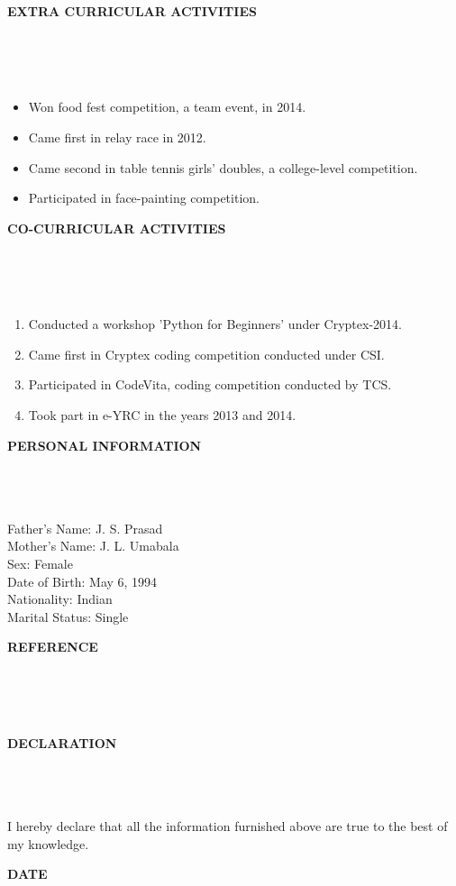 \documentclass[a4paper,10pt]{article}
\newcommand{\lsep}{-0.5cm}
\newcommand{\resheading}[1]{{\small \colorbox{mygrey}{\begin{minipage}{0.975\textwidth}{\textbf{#1 \vphantom{p\^{E}}}}\end{minipage}}}}
\begin{document}
\resheading{\textbf{EXTRA CURRICULAR ACTIVITIES} }\\[\lsep]
\\ \\
\begin{itemize}
	\item Won food fest competition, a team event, in 2014.
	\item Came first in relay race in 2012.
	\item Came second in table tennis girls' doubles, a college-level competition.
	\item Participated in face-painting competition.
\end{itemize}


\resheading{\textbf{CO-CURRICULAR ACTIVITIES} }\\[\lsep]
\\ \\
\begin{enumerate}
	\item \noindent Conducted a workshop 'Python for Beginners' under Cryptex-2014.
	\item \noindent Came first in Cryptex coding competition conducted under CSI.
	\item \noindent Participated in CodeVita, coding competition conducted by TCS.
	\item \noindent Took part in e-YRC in the years 2013 and 2014.
	
\end{enumerate}

\resheading{\textbf{PERSONAL INFORMATION} }\\[\lsep]
\\ \\
\indent Father’s Name: J. S. Prasad \\
\indent Mother’s Name: J. L. Umabala \\
\indent Sex: Female \\
\indent Date of Birth: May 6, 1994 \\
\indent Nationality: Indian \\
\indent Marital Status: Single \\

\resheading{\textbf{REFERENCE} }\\[\lsep]
\\ \\


\resheading{\textbf{DECLARATION} }\\[\lsep]
\\ \\
\indent I hereby declare that all the information furnished above are true to the best of my knowledge.


\resheading{\textbf{DATE} }\\[\lsep]
\\ \\
\end{document}
